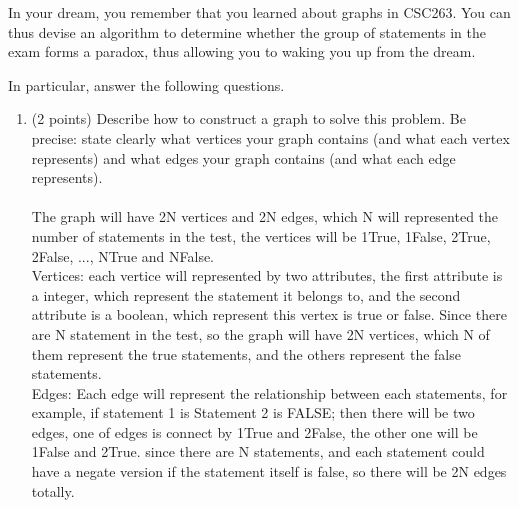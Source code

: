 \documentclass{assignment-263}
\begin{document}
\begin{enumerate}
    In your dream, you remember that you learned about graphs in CSC263.
    You can thus devise an algorithm to determine whether the group of statements in the exam
    forms a paradox, thus allowing you to waking you up from the dream.

	In particular, answer the following questions.
	\begin{enumerate}%

    \item (2 points)
		Describe how to construct a graph to solve this problem. Be
		precise: state clearly what vertices your graph contains (and what
		each vertex represents) and what edges your graph contains (and what
		each edge represents).\\\\
	The graph will have 2N vertices and 2N edges, which N will represented the number of statements in the test, the vertices will be 1True, 1False, 2True, 2False, ..., NTrue and NFalse.\\
	Vertices: each vertice will represented by two attributes, the first attribute is a integer, which represent the statement it belongs to, and the second attribute is a boolean, which represent this vertex is true or false. Since there are N statement in the test, so the graph will have 2N vertices, which N of them represent the true statements, and the others represent the false statements.\\
	Edges: Each edge will represent the relationship between each statements, for example, if statement 1 is Statement 2 is FALSE; then there will be two edges, one of edges is connect by 1True and 2False, the other one will be 1False and 2True. since there are N statements, and each statement could have a negate version if the statement itself is false, so there will be 2N edges totally.


\end{enumerate}
\end{enumerate}
\end{document}
